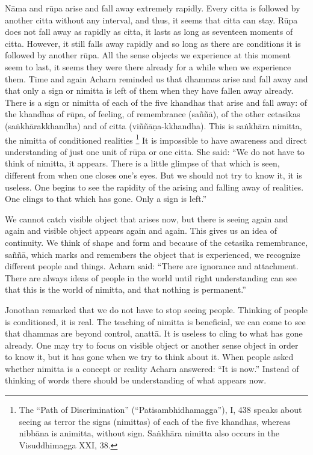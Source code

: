 {{{{{{{Nāma and rūpa arise and fall away
extremely rapidly. Every citta is followed by another citta without any
interval, and thus, it seems that citta can stay. Rūpa does not fall
away as rapidly as citta, it lasts as long as seventeen moments of
citta. However, it still falls away rapidly and so long as there are
conditions it is followed by another rūpa. All the sense objects we
experience at this moment seem to last, it seems they were there already
for a while when we experience them. Time and again Acharn reminded us
that dhammas arise and fall away and that only a sign or nimitta is left
of them when they have fallen away already. There is a sign or nimitta
of each of the five khandhas that arise and fall away: of the khandhas
of rūpa, of feeling, of remembrance (saññā), of the other cetasikas
(saṅkhārakkhandha) and of citta (viññāṇa-kkhandha). This is saṅkhāra
nimitta, the nimitta of conditioned realities
\footnote{The ``Path of Discrimination''
(``Patisambhidhamagga''), I, 438 speaks about seeing as terror the signs
(nimittas) of each of the five khandhas, whereas nibbāna is animitta,
without sign. Saṅkhāra nimitta also occurs in the Visuddhimagga XXI, 38.}
It is impossible to have awareness and direct understanding of just one
unit of rūpa or one citta. She said: ``We do not have to think of
nimitta, it appears. There is a little glimpse of that which is seen,
different from when one closes one's eyes. But we should not try to know
it, it is useless. One begins to see the rapidity of the arising and
falling away of realities. One clings to that which has gone. Only a
sign is left.'' 

We cannot catch visible object that
arises now, but there is seeing again and again and visible object
appears again and again. This gives us an idea of continuity. We think
of shape and form and because of the cetasika remembrance, saññā, which
marks and remembers the object that is experienced, we recognize
different people and things. Acharn said: ``There are ignorance and
attachment. There are always ideas of people in the world until right
understanding can see that this is the world of nimitta, and that
nothing is permanent.'' 

Jonothan remarked that we do not have
to stop seeing people. Thinking of people is conditioned, it is real.
The teaching of nimitta is beneficial, we can come to see that dhammas
are beyond control, anattā. It is useless to cling to what has gone
already. One may try to focus on visible object or another sense object
in order to know it, but it has gone when we try to think about it. When
people asked whether nimitta is a concept or reality Acharn answered:
``It is now.'' Instead of thinking of words there should be
understanding of what appears now. 

}}}}}}}
